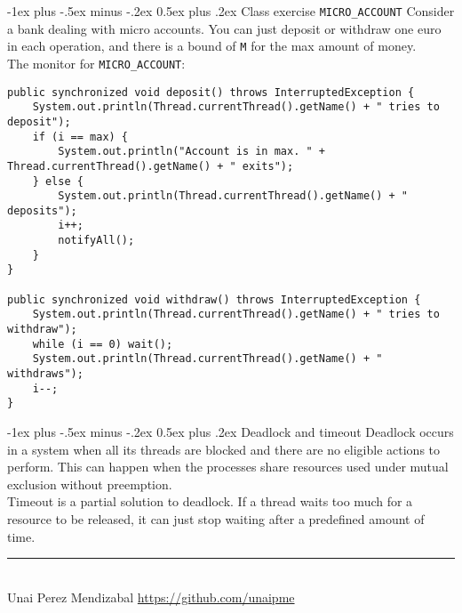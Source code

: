 \documentclass[10pt,landscape]{article}
\makeatletter
\renewcommand{\section}{\@startsection{section}{1}{0mm}%
                                {-1ex plus -.5ex minus -.2ex}%
                                {0.5ex plus .2ex}%
                                {\normalfont\large\bfseries}}
\makeatother
\begin{document}
\begin{multicols}{3}
\section{Class exercise \texttt{MICRO\_ACCOUNT}}
Consider a bank dealing with micro accounts. You can just deposit or withdraw one euro in each operation, and there is a bound of \texttt{M} for the max amount of money. \\
The monitor for \texttt{MICRO\_ACCOUNT}:
\begin{verbatim}
public synchronized void deposit() throws InterruptedException {
    System.out.println(Thread.currentThread().getName() + " tries to deposit");
    if (i == max) {
        System.out.println("Account is in max. " + Thread.currentThread().getName() + " exits");
    } else {
        System.out.println(Thread.currentThread().getName() + " deposits");
        i++;
        notifyAll();
    }
}

public synchronized void withdraw() throws InterruptedException {
    System.out.println(Thread.currentThread().getName() + " tries to withdraw");
    while (i == 0) wait();
    System.out.println(Thread.currentThread().getName() + " withdraws");
    i--;
}
\end{verbatim}
\section{Deadlock and timeout}
Deadlock occurs in a system when all its threads are blocked and there are no eligible actions to perform. This can happen when the processes share resources used under mutual exclusion without preemption. \\
Timeout is a partial solution to deadlock. If a thread waits too much for a resource to be released, it can just stop waiting after a predefined amount of time.
\vfill
\hrule
~\\
Unai Perez Mendizabal \textcopyright \href{https://github.com/unaipme}{https://github.com/unaipme}
\end{multicols}
\end{document}
